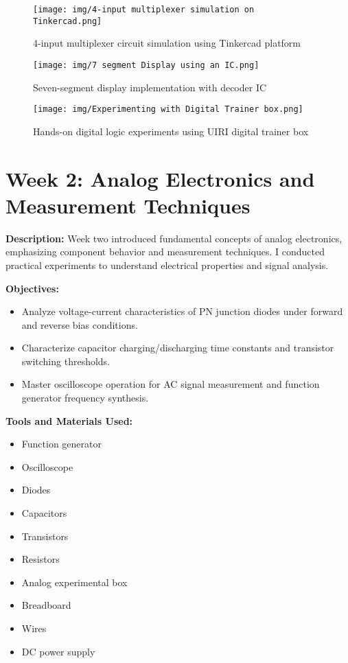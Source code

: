 \documentclass[12pt,a4paper]{report}
\begin{document}
\begin{figure}[H]
\centering
\texttt{[image: img/4-input multiplexer simulation on Tinkercad.png]}
\caption{4-input multiplexer circuit simulation using Tinkercad platform}
\label{fig:multiplexer-sim}

\vspace{3.5em}

\begin{minipage}[t]{0.49\textwidth}
  \centering
  \texttt{[image: img/7 segment Display using an IC.png]}
  \caption{Seven-segment display implementation with decoder IC}
  \label{fig:7segment-display}
\end{minipage}
\hfill
\begin{minipage}[t]{0.49\textwidth}
  \centering
  \texttt{[image: img/Experimenting with Digital Trainer box.png]}
  \caption{Hands-on digital logic experiments using UIRI digital trainer box}
  \label{fig:digital-trainer}
\end{minipage}
\end{figure}


\newpage
\section{Week 2: Analog Electronics and Measurement Techniques}

\noindent\textbf{Description:} Week two introduced fundamental concepts of analog electronics, emphasizing component behavior and measurement techniques. I conducted practical experiments to understand electrical properties and signal analysis.

\noindent\textbf{Objectives:}
\begin{itemize}
    \item Analyze voltage-current characteristics of PN junction diodes under forward and reverse bias conditions.
    \item Characterize capacitor charging/discharging time constants and transistor switching thresholds.
    \item Master oscilloscope operation for AC signal measurement and function generator frequency synthesis.
\end{itemize}

\noindent\textbf{Tools and Materials Used:}
\begin{multicols}{2}
\begin{itemize}
    \item Function generator
    \item Oscilloscope
    \item Diodes
    \item Capacitors
    \item Transistors
    \item Resistors
    \item Analog experimental box
    \item Breadboard
    \item Wires
    \item DC power supply
\end{itemize}
\end{multicols}
\end{document}
